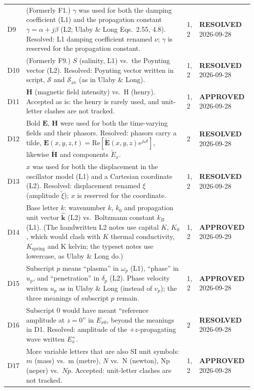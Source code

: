 \documentclass[11pt, oneside]{article}
\newcommand{\approved}{\textbf{APPROVED}}
\newcommand{\resolved}{\textbf{RESOLVED}}
\begin{document}
\begin{longtable}{l >{\raggedright\arraybackslash}p{} l l}
D9 & (Formerly F1.) $\gamma$ was used for both the damping coefficient (L1) and the propagation constant $\gamma=\alpha+j\beta$ (L2; Ulaby \& Long Eqs.~2.55, 4.8). Resolved: L1 damping coefficient renamed $\nu$; $\gamma$ is reserved for the propagation constant. & 1, 2 & \resolved{} 2026-09-28 \\
D10 & (Formerly F9.) $S$ (salinity, L1) vs.\ the Poynting vector (L2). Resolved: Poynting vector written in script, $\boldsymbol{\mathcal{S}}$ and $\boldsymbol{\mathcal{S}}_\mathrm{av}$ (as in Ulaby \& Long). & 1, 2 & \resolved{} 2026-09-28 \\
D11 & $\mathbf{H}$ (magnetic field intensity) vs.\ H (henry). Accepted as is: the henry is rarely used, and unit-letter clashes are not tracked. & 1, 2 & \approved{} 2026-09-28 \\
D12 & Bold $\mathbf{E}$, $\mathbf{H}$ were used for both the time-varying fields and their phasors. Resolved: phasors carry a tilde, $\mathbf{E}(x,y,z,t) = \mathrm{Re}[\tilde{\mathbf{E}}(x,y,z)e^{j\omega t}]$, likewise $\tilde{\mathbf{H}}$ and components $\tilde{E}_x$. & 2 & \resolved{} 2026-09-28 \\
D13 & $x$ was used for both the displacement in the oscillator model (L1) and a Cartesian coordinate (L2). Resolved: displacement renamed $\xi$ (amplitude $\tilde{\xi}$); $x$ is reserved for the coordinate. & 1, 2 & \resolved{} 2026-09-28 \\
D14 & Base letter $k$: wavenumber $k$, $k_0$ and propagation unit vector $\hat{\mathbf{k}}$ (L2) vs.\ Boltzmann constant $k_B$ (L1). (The handwritten L2 notes use capital $K$, $K_0$, which would clash with $K$ thermal conductivity, $K_\mathrm{spring}$ and K kelvin; the typeset notes use lowercase, as Ulaby \& Long do.) & 1, 2 & \approved{} 2026-09-29 \\
D15 & Subscript $p$ means ``plasma'' in $\omega_p$ (L1), ``phase'' in $u_p$, and ``penetration'' in $\delta_p$ (L2). Phase velocity written $u_p$ as in Ulaby \& Long (instead of $v_p$); the three meanings of subscript $p$ remain. & 1, 2 & \approved{} 2026-09-28 \\
D16 & Subscript 0 would have meant ``reference amplitude at $z=0$'' in $E_{x0}$, beyond the meanings in D1. Resolved: amplitude of the $+z$-propagating wave written $E_x^+$. & 2 & \resolved{} 2026-09-28 \\
D17 & More variable letters that are also SI unit symbols: $m$ (mass) vs.\ m (metre), $N$ vs.\ N (newton), Np (neper) vs.\ $Np$. Accepted: unit-letter clashes are not tracked. & 1, 2 & \approved{} 2026-09-28 \\

\end{longtable}
\end{document}
